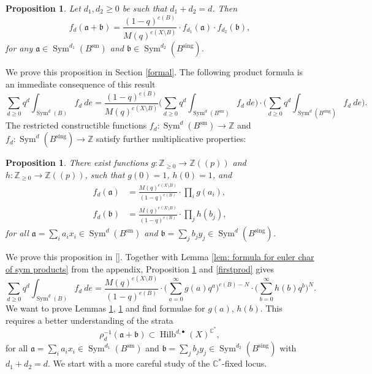 \documentclass{amsart}
\newtheorem{proposition}[theorem]{Proposition}
\theoremstyle{definition}
\newcommand{\CC} {\mathbb{C}}          %
\newcommand{\ZZ} {\mathbb{Z}}		%
\newcommand{\Sym}{\operatorname{Sym}}
\newcommand{\Hilb}{\operatorname{Hilb}}
\newcommand{\sm}{\operatorname{sm}}
\newcommand{\sing}{\operatorname{sing}}
\begin{document}
\begin{proposition} \label{mult1}
Let $d_1, d_2 \geq 0$ be such that $d_1+d_2 = d$. Then 
$$ 
f_d(\mathfrak{a} + \mathfrak{b}) =\frac{(1-q)^{e(B)}}{M(q)^{e(X\setminus B)}} \cdot f_{d_1}(\mathfrak{a}) \cdot f_{d_2}(\mathfrak{b}), 
$$
for any $\mathfrak{a} \in \Sym^{d_1}(B^{\sm})$ and $\mathfrak{b} \in \Sym^{d_2}(B^{\sing})$. 
\end{proposition}
We prove this proposition in Section \ref{formal}. The following product formula is an immediate consequence of this result
\begin{equation} \label{firstprod}
\sum_{d \geq 0} q^d \int_{\Sym^d(B)} f_d \ de = \frac{(1-q)^{e(B)}}{M(q)^{e(X\setminus B)}}  \Big( \sum_{d \geq 0} q^d \int_{\Sym^d(B^{\sm})} f_d \ de \Big) \cdot \Big( \sum_{d \geq 0} q^d \int_{\Sym^d(B^{\sing})} f_d \ de \Big). 
\end{equation}
The restricted constructible functions $f_d  : \Sym^d(B^{\sm}) \rightarrow \ZZ$ and $f_d  : \Sym^d(B^{\sing}) \rightarrow \ZZ$ satisfy further multiplicative properties:
\begin{proposition} \label{mult2}
There exist functions $g : \ZZ_{\geq 0} \rightarrow \ZZ(\!(p)\!)$ and $h : \ZZ_{\geq 0} \rightarrow \ZZ(\!(p)\!)$, such that $g(0)=1$, $h(0)=1$, and
\begin{align*}
f_{d}(\mathfrak{a}) &= \frac{M(q)^{e(X\setminus B)}}{(1-q)^{e(B)}} \cdot \prod_{i} g(a_i), \\
f_{d}(\mathfrak{b}) &= \frac{M(q)^{e(X\setminus B)}}{(1-q)^{e(B)}} \cdot \prod_{j} h(b_j), 
\end{align*}
for all $\mathfrak{a} = \sum_i a_i x_i \in \Sym^{d}(B^{\sm})$ and $\mathfrak{b} = \sum_j b_j y_j \in \Sym^{d}(B^{\sing})$.
\end{proposition}
We prove this proposition in \ref{}. Together with Lemma \ref{lem: formula for euler char of sym products} from the appendix, Proposition \ref{mult2} and \eqref{firstprod} gives
$$
\sum_{d \geq 0} q^d \int_{\Sym^d(B)} f_d \ de = \frac{M(q)^{e(X\setminus B)}}{(1-q)^{e(B)}} \cdot \Big( \sum_{a=0}^{\infty} g(a) q^a \Big)^{e(B) - N} \cdot \Big( \sum_{b=0}^{\infty} h(b) q^b \Big)^N.
$$
We want to prove Lemmas \ref{mult1}, \ref{mult2} and find formulae for $g(a)$, $h(b)$. This requires a better understanding of the strata
$$
\rho_{d}^{-1} (\mathfrak{a} + \mathfrak{b}) \subset \Hilb^{d, \bullet}(X)^{\CC^*},
$$
for all $\mathfrak{a} = \sum_i a_i x_i \in \Sym^{d_1}(B^{\sm})$ and $\mathfrak{b} = \sum_j b_j y_j \in \Sym^{d_2}(B^{\sing})$ with $d_1+d_2=d$. We start with a more careful study of the $\CC^*$-fixed locus.
\end{document}
